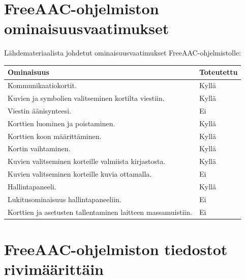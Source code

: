 \documentclass[utf8]{gradu3}
\begin{document}

\printbibliography

%

\appendix

\section{FreeAAC-ohjelmiston ominaisuusvaatimukset}

Lähdemateriaalista johdetut ominaisuusvaatimukset FreeAAC-ohjelmistolle:

\begin{center}
    \begin{tabular}{ | l | l |}
    \hline
    \textbf{Ominaisuus} & \textbf{Toteutettu} \\ \hline
    Kommunikaatiokortit. & Kyllä \\ \hline
    Kuvien ja symbolien valitseminen kortilta viestiin. & Kyllä \\ \hline
    Viestin äänisynteesi. & Ei \\ \hline
    Korttien luominen ja poistaminen. & Kyllä \\ \hline
    Korttien koon määrittäminen. & Kyllä \\ \hline
    Kortin vaihtaminen. & Kyllä \\ \hline
    Kuvien valitseminen korteille valmiista kirjastosta. & Kyllä \\ \hline
    Kuvien valitseminen korteille kuvia ottamalla. & Ei \\ \hline
    Hallintapaneeli. & Kyllä \\ \hline
    Lukitusominaisuus hallintapaneeliin. & Ei \\ \hline
    Korttien ja asetusten tallentaminen laitteen massamuistiin. & Ei \\ \hline
    \end{tabular}
\end{center}

\section{FreeAAC-ohjelmiston tiedostot rivimäärittäin}
\end{document}
